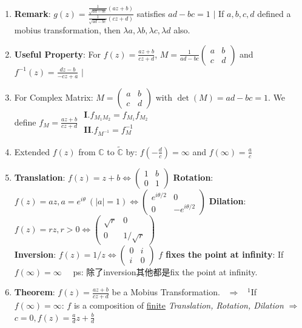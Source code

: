 \documentclass[9pt]{article}
\begin{document}
\begin{enumerate}[itemsep=-2pt, topsep=-2pt]
    \item \textbf{Remark}: $g(z)=\frac{\frac{1}{\sqrt{ad-bc}}(az+b)}{\frac{1}{\sqrt{ad-bc}}(cz+d)}$ satisfies $ad-bc=1$ \quad $\big|$ \quad If $a,b,c,d$ defined a mobius transformation, then $\lambda a,\lambda b,\lambda c,\lambda d$ also.
    \item \textbf{Useful Property}: For $f(z)=\frac{az+b}{cz+d}$, $M=\frac{1}{ad-bc}${\scriptsize $\begin{pmatrix} a & b \\  c & d\end{pmatrix}$} \qquad and $f^{-1}(z)=\frac{dz-b}{-cz+a}$ \quad $\big|$ 
    \item For Complex Matrix: $M=\begin{pmatrix}a & b \\ c & d\end{pmatrix}$ with $\det(M) = ad-bc=1$. \quad We define $f_{M}=\frac{az+b}{cz+d}$ \qquad $\begin{matrix}\textbf{I}. f_{M_1M_2}=f_{M_1}f_{M_2} \\ \textbf{II}. f_{M^{-1}}=f_M^{-1} \qquad \end{matrix}$
    \item Extended $f(z)$ from $\mathbb{C}$ to $\widetilde{\mathbb{C}}$ by: $f(-\frac{d}{c})=\infty$ and $f(\infty)=\frac{a}{c}$
    \item {\footnotesize \textbf{Translation}: $f(z)=z+b\Leftrightarrow \begin{pmatrix}1 & b \\ 0 & 1\end{pmatrix}$ \quad \textbf{Rotation}: $f(z)=az,a=e^{i\theta} \ (|a|=1)\Leftrightarrow \begin{pmatrix}e^{i\theta/2} & 0 \\ 0 & -e^{i\theta/2}\end{pmatrix}$ \quad \textbf{Dilation}: $f(z)=rz,r>0 \Leftrightarrow \begin{pmatrix}\sqrt{r} & 0 \\ 0 & 1/\sqrt{r}\end{pmatrix}$} \\
    {\footnotesize \textbf{Inversion}: $f(z)=1/z \Leftrightarrow \begin{pmatrix}0 & i \\ i & 0\end{pmatrix}$ \quad \textbf{$f$ fixes the point at infinity}: If $f(\infty)=\infty$ \ \ {\scriptsize ps: 除了inversion其他都是fix the point at infinity.}}
    \item {\footnotesize \textbf{Theorem}: $f(z)=\frac{az+b}{cz+d}$ be a Mobius Transformation. \ $\Rightarrow$ \ $^1$If $f(\infty)=\infty$: $f$ is a composition of \underline{finite} \textit{Translation, Rotation, Dilation} $\Rightarrow$ $c=0,f(z)=\frac{a}{d}z+\frac{b}{d}$}
\end{enumerate}
\end{document}

